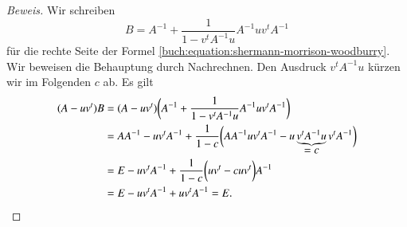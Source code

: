 \begin{proof}[Beweis]
Wir schreiben 
\[
B
=
A^{-1} + \frac{1}{1-v^tA^{-1}u} A^{-1}uv^tA^{-1}
\]
für die rechte Seite der
Formel \eqref{buch:equation:shermann-morrison-woodburry}.
Wir beweisen die Behauptung durch Nachrechnen.
Den Ausdruck $v^tA^{-1}u$ kürzen wir im Folgenden $c$ ab.
Es gilt
\begin{align*}
(A-uv^t)
B
&=
(A-uv^t)
\biggl(
A^{-1} + \frac{1}{1-v^tA^{-1}u} A^{-1}uv^tA^{-1}
\biggr)
\\
&=
AA^{-1}-uv^tA^{-1}
+
\frac{1}{1-c}
\biggl(
AA^{-1}uv^tA^{-1}
-u\underbrace{v^tA^{-1}u}_{\displaystyle=c}v^tA^{-1}
\biggr)
\\
&=
E-uv^tA^{-1}
+
\frac{1}{1-c}
\biggl(
uv^t
-cu v^t
\biggr)A^{-1}
\\
&=
E-uv^tA^{-1}
+
uv^t
A^{-1}
=
E.
\qedhere
\end{align*}
\end{proof}

